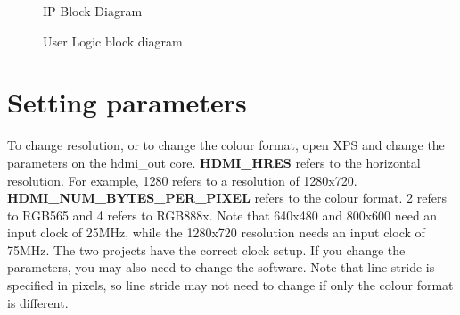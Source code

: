 \documentclass[12pt]{article}
\begin{document}
	\begin{figure}
	\centering
	\caption{IP Block Diagram}
	\end{figure}

	\begin{figure}
	\centering
	\caption{User Logic block diagram}
	\end{figure}
  \section{Setting parameters}
  To change resolution, or to change the colour format, open XPS and change the parameters on the hdmi\_out core. \textbf {HDMI\_HRES} refers to the horizontal resolution. For example, 1280 refers to a resolution of 1280x720. \textbf {HDMI\_NUM\_BYTES\_PER\_PIXEL} refers to the colour format. 2 refers to RGB565 and 4 refers to RGB888x. Note that 640x480 and 800x600 need an input clock of 25MHz, while the 1280x720 resolution needs an input clock of 75MHz. The two projects have the correct clock setup. If you change the parameters, you may also need to change the software. Note that line stride is specified in pixels, so line stride may not need to change if only the colour format is different.
\end{document}
